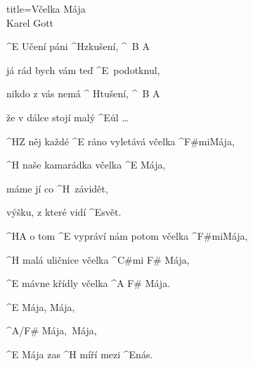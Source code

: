 \begin{song}{title=\predtitle\centering Včelka Mája \\\large Karel Gott  \vspace*{-0.3cm}}  %
\begin{centerjustified}
\nejvetsi

\sloka
	^{E \z}Učení páni ^{\z H}zkušení, ^{\, B A}

	já rád bych vám teď ^{\z E \,}podotknul,

	nikdo z vás nemá ^{ \z H}tušení, ^{\, B A}

	že v dálce stojí malý ^{E}úl \dots

	^{H}Z něj každé ^{E \z}ráno vyletává včelka ^{F\#mi}Mája,

	^{H \z}naše kamarádka včelka ^{E \z}Mája,

	máme jí co ^{\z H \,}závidět,
	
	výšku, z které vidí ^{E}svět.

	\phantom{\,}

	^{H}A o tom ^{E \z}vypráví nám potom včelka ^{F\#mi}Mája,

	^{H \z}malá uličnice včelka ^{C\#mi F\# \z}Mája,~~~~~~~~

	^{E \z}mávne křídly včelka ^{A F\# \z}Mája.~~~

	\phantom{\,}

	^{E \z}Mája, Mája,
	
	^{A/F\#  \z}Mája,~Mája,

	^{E \z}Mája zas ^{H \z}míří mezi ^{E}nás.

\end{centerjustified}
\setcounter{Slokočet}{0}
\end{song}
